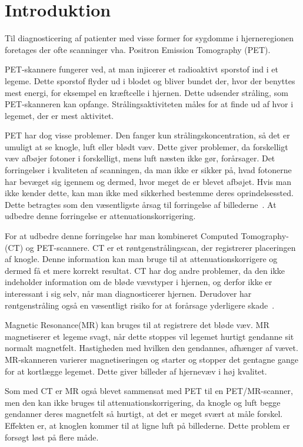 \section{Introduktion}

Til diagnosticering af patienter med visse former for sygdomme i
hjerneregionen foretages der ofte scanninger vha. Positron Emission
Tomography (PET).

PET-skannere fungerer ved, at man injicerer et radioaktivt sporstof
ind i et legeme. Dette sporstof flyder ud i blodet og bliver bundet
der, hvor der benyttes mest energi, for eksempel en kræftcelle i
hjernen. Dette udsender stråling, som PET-skanneren kan opfange.
Strålingsaktiviteten måles for at finde ud af hvor i legemet, der er
mest aktivitet.

PET har dog visse problemer. Den fanger kun strålingskoncentration,
så det er umuligt at se knogle, luft eller blødt væv. Dette giver
problemer, da forskelligt væv afbøjer fotoner i forskelligt,
mens luft næsten ikke gør, forårsager. Det forringelser i kvaliteten
af scanningen, da man ikke er sikker på, hvad fotonerne har bevæget
sig igennem og dermed, hvor meget de er blevet afbøjet. Hvis man ikke
kender dette, kan man ikke med sikkerhed bestemme deres oprindelsessted.
Dette betragtes som den væsentligste årsag til forringelse af
billederne~\cite{vigtighedAfAttenuation}. At udbedre denne forringelse er
attenuationskorrigering.

For at udbedre denne forringelse har man kombineret Computed
Tomo\-graphy- (CT) og PET-scannere. CT er et røntgenstrålingscan,
der registrerer placeringen af knogle. Denne information kan man bruge
til at attenuationskorrigere og dermed få et mere korrekt resultat.
CT har dog andre problemer, da den ikke indeholder information om de
bløde vævstyper i hjernen, og derfor ikke er interessant i sig selv, når
man diagnosticerer hjernen. Derudover har røntgenstråling også
en væsentligt risiko for at forårsage yderligere skade~\cite{skadeligCT}.

Magnetic Resonance(MR) kan bruges til at registrere det bløde væv.
MR magnetiserer et legeme svagt, når dette stoppes vil legemet hurtigt
gendanne sit normalt magnetfelt. Hastigheden med hvilken den gendannes,
afhænger af vævet. MR-skanneren varierer magnetiseringen og starter og
stopper det gentagne gange for at kortlægge legemet. Dette giver billeder
af hjernevæv i høj kvalitet.

Som med CT er MR også blevet sammensat med PET til en PET/MR-scanner,
men den kan ikke bruges til attenuationskorrigering, da knogle og luft
begge gendanner deres magnetfelt så hurtigt, at det er meget svært at
måle forskel. Effekten er, at knoglen kommer til at ligne luft på
billederne. Dette problem er forsøgt løst på flere måde.

